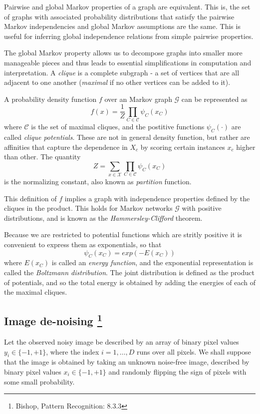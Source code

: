 \documentclass{scrartcl}
\begin{document}
\begin{appendices}
Pairwise and global Markov properties of a graph are equivalent. This is, the set of graphs with associated probability distributions that satisfy the pairwise Markov independencies and global Markov assumptions are the same. This is useful for inferring global independence relations from simple pairwise properties.

The global Markov property allows us to decompose graphs into smaller more manageable pieces and thus leads to essential simplifications in computation and interpretation. A \textit{clique} is a complete subgraph - a set of vertices that are all adjacent to one another (\textit{maximal} if no other vertices can be added to it).

A probability density function \(f\) over an Markov graph \(\mathcal{G}\) can be represented as
\[f(x) = \frac{1}{Z} \prod_{C \in \mathcal{C}} \psi_C(x_C)\]
where \(\mathcal{C}\) is the set of maximal cliques, and the postitive functions \(\psi_C(\cdot)\) are called \textit{clique potentials}. These are not in general density function, but rather are affinities that capture the dependence in \(X_c\) by scoring certain instances \(x_c\) higher than other. The quantity
\[Z = \sum_{x \in \mathcal{X}}\prod_{C \in \mathcal{C}} \psi_C (x_C)\]
is the normalizing constant, also known as \textit{partition} function.

This definition of \(f\) implies a graph with independence properties defined by the cliques in the product. This holds for Markov networks \(\mathcal{G}\) with positive distributions, and is known as the \textit{Hammersley-Clifford} theorem.

Because we are restricted to potential functions which are stritly positive it is convenient to express them as exponentials, so that
\[\psi_C(x_C) = exp(-E(x_C))\]
where \(E(x_C)\) is called an \textit{energy function}, and the exponential representation is called the \textit{Boltzmann distribution}. The joint distribution is defined as the product of potentials, and so the total energy is obtained by adding the energies of each of the maximal cliques.

\subsection{Image de-noising \protect\footnote{Bishop, Pattern Recognition: 8.3.3}}
Let the observed noisy image be described by an array of binary pixel values \(y_i \in \{-1, +1\}\), where the index \(i = 1, \dots, D\) runs over all pixels. We shall suppose that the image is obtained by taking  an unknown noise-free image, described by binary pixel values \(x_i \in \{-1, +1\}\) and randomly flipping the sign of pixels with some small probability.


\end{appendices}
\end{document}
